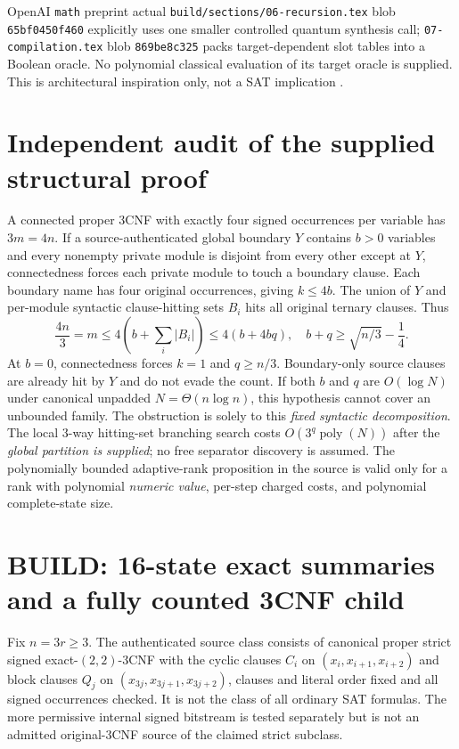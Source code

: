 \documentclass[11pt]{article}
\begin{document}
OpenAI \texttt{math} preprint actual \texttt{build/sections/06-recursion.tex} blob \texttt{65bf0450f460} explicitly uses one smaller controlled quantum synthesis call; \texttt{07-compilation.tex} blob \texttt{869be8c325} packs target-dependent slot tables into a Boolean oracle. No polynomial classical evaluation of its target oracle is supplied. This is architectural inspiration only, not a SAT implication \cite{oai}.

\section{Independent audit of the supplied structural proof}
A connected proper 3CNF with exactly four signed occurrences per variable has $3m=4n$. If a source-authenticated global boundary $Y$ contains $b>0$ variables and every nonempty private module is disjoint from every other except at $Y$, connectedness forces each private module to touch a boundary clause. Each boundary name has four original occurrences, giving $k\le4b$. The union of $Y$ and per-module syntactic clause-hitting sets $B_i$ hits all original ternary clauses. Thus
\[
\frac{4n}{3}=m\le4\left(b+\sum_i|B_i|\right)\le4(b+4bq),
\quad b+q\ge\sqrt{n/3}-\frac14.
\]
At $b=0$, connectedness forces $k=1$ and $q\ge n/3$. Boundary-only source clauses are already hit by $Y$ and do not evade the count. If both $b$ and $q$ are $O(\log N)$ under canonical unpadded $N=\Theta(n\log n)$, this hypothesis cannot cover an unbounded family. The obstruction is solely to this \emph{fixed syntactic decomposition}. The local 3-way hitting-set branching search costs $O(3^q\operatorname{poly}(N))$ after the \emph{global partition is supplied}; no free separator discovery is assumed. The polynomially bounded adaptive-rank proposition in the source is valid only for a rank with polynomial \emph{numeric value}, per-step charged costs, and polynomial complete-state size.

\section{BUILD: 16-state exact summaries and a fully counted 3CNF child}
Fix $n=3r\ge3$. The authenticated source class consists of canonical proper strict signed exact-$(2,2)$-3CNF with the cyclic clauses $C_i$ on $(x_i,x_{i+1},x_{i+2})$ and block clauses $Q_j$ on $(x_{3j},x_{3j+1},x_{3j+2})$, clauses and literal order fixed and all signed occurrences checked. It is not the class of all ordinary SAT formulas. The more permissive internal signed bitstream is tested separately but is not an admitted original-3CNF source of the claimed strict subclass.
\end{document}
